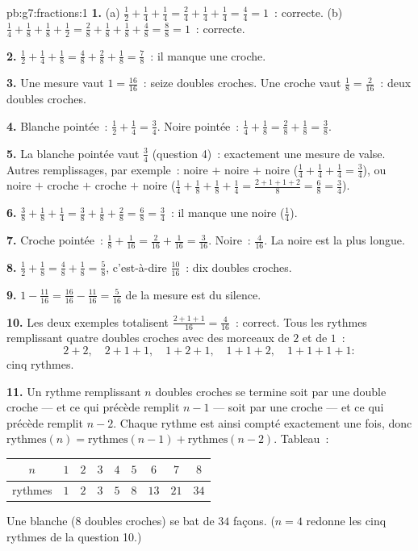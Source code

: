 \begin{solution}{pb:g7:fractions:1}
\textbf{1.} (a) $\frac12 + \frac14 + \frac14 = \frac24 + \frac14
+ \frac14 = \frac44 = 1$~: correcte. (b) $\frac14 + \frac18 +
\frac18 + \frac12 = \frac28 + \frac18 + \frac18 + \frac48 =
\frac88 = 1$~: correcte.

\textbf{2.} $\frac12 + \frac14 + \frac18 = \frac48 + \frac28 +
\frac18 = \frac78$~: il manque une croche.

\textbf{3.} Une mesure vaut $1 = \frac{16}{16}$~: seize doubles
croches. Une croche vaut $\frac18 = \frac{2}{16}$~: deux doubles
croches.

\textbf{4.} Blanche pointée~: $\frac12 + \frac14 = \frac34$. Noire
pointée~: $\frac14 + \frac18 = \frac28 + \frac18 = \frac38$.

\textbf{5.} La blanche pointée vaut $\frac34$ (question 4)~:
exactement une mesure de valse. Autres remplissages, par exemple~:
noire $+$ noire $+$ noire ($\frac14 + \frac14 + \frac14 =
\frac34$), ou noire $+$ croche $+$ croche $+$ noire
($\frac14 + \frac18 + \frac18 + \frac14 = \frac{2 + 1 + 1 +
2}{8} = \frac68 = \frac34$).

\textbf{6.} $\frac38 + \frac18 + \frac14 = \frac38 + \frac18 +
\frac28 = \frac68 = \frac34$~: il manque une noire ($\frac14$).

\textbf{7.} Croche pointée~: $\frac18 + \frac{1}{16} =
\frac{2}{16} + \frac{1}{16} = \frac{3}{16}$. Noire~:
$\frac{4}{16}$. La noire est la plus longue.

\textbf{8.} $\frac12 + \frac18 = \frac48 + \frac18 = \frac58$,
c'est-à-dire $\frac{10}{16}$~: dix doubles croches.

\textbf{9.} $1 - \frac{11}{16} = \frac{16}{16} - \frac{11}{16}
= \frac{5}{16}$ de la mesure est du silence.

\textbf{10.} Les deux exemples totalisent
$\frac{2 + 1 + 1}{16} = \frac{4}{16}$~: correct. Tous les rythmes
remplissant quatre doubles croches avec des morceaux de $2$ et de
$1$~:
\[
2{+}2, \quad 2{+}1{+}1, \quad 1{+}2{+}1, \quad 1{+}1{+}2, \quad
1{+}1{+}1{+}1 :
\]
cinq rythmes.

\textbf{11.} Un rythme remplissant $n$ doubles croches se termine
soit par une double croche --- et ce qui précède remplit $n - 1$ ---
soit par une croche --- et ce qui précède remplit $n - 2$. Chaque
rythme est ainsi compté exactement une fois, donc
$\text{rythmes}(n) = \text{rythmes}(n-1) + \text{rythmes}(n-2)$.
Tableau~:
\begin{center}
\renewcommand{\arraystretch}{1.2}
\begin{tabular}{c|cccccccc}
$n$ & $1$ & $2$ & $3$ & $4$ & $5$ & $6$ & $7$ & $8$ \\
\hline
rythmes & $1$ & $2$ & $3$ & $5$ & $8$ & $13$ & $21$ & $34$ \\
\end{tabular}
\end{center}
Une blanche ($8$ doubles croches) se bat de $34$ façons. ($n = 4$
redonne les cinq rythmes de la question 10.)


\end{solution}
